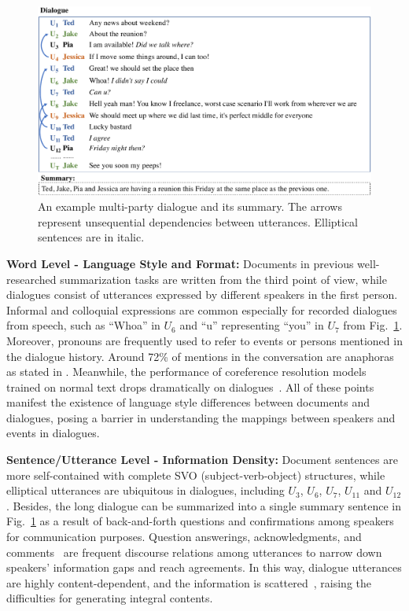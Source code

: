 \begin{figure}[ht]
	\centering
	\includegraphics[scale=0.48]{fig/example.pdf}
	\caption{An example multi-party dialogue and its summary. The arrows represent unsequential dependencies between utterances. Elliptical sentences are in italic.}
	\label{fig:example}
\end{figure}

\textbf{Word Level - Language Style and Format:} 
Documents in previous well-researched summarization tasks are written from the third point of view, while dialogues consist of utterances expressed by different speakers in the first person. Informal and colloquial expressions are common especially for recorded dialogues from speech, such as ``Whoa'' in $U_6$ and ``u'' representing ``you'' in $U_7$ from Fig.~\ref{fig:example}.
Moreover, pronouns are frequently used to refer to events or persons mentioned in the dialogue history. Around 72\% of mentions in the conversation are {anaphoras} %
as stated in \citet{bai2021joint}. Meanwhile, the performance of coreference resolution models trained on normal text drops dramatically on dialogues~\cite{liu2021coreference}. All of these points manifest the existence of language style differences between documents and dialogues, posing a barrier in understanding the mappings between speakers and events in dialogues.


\textbf{Sentence/Utterance Level - Information Density:}
Document sentences are more self-contained with complete SVO (subject-verb-object) structures, while elliptical utterances are ubiquitous in dialogues, including $U_3$, $U_6$, $U_7$, $U_{11}$ and $U_{12}$.
Besides, the long dialogue can be summarized into a single summary sentence in Fig.~\ref{fig:example} as a result of back-and-forth questions and confirmations among speakers for communication purposes.
Question answerings, acknowledgments, and comments~\cite{asher2016discourse} are frequent discourse relations among utterances to narrow down speakers' information gaps and reach agreements.
In this way, dialogue utterances are highly content-dependent, and the information is scattered~\cite{zhang2021exploratory}, raising the difficulties for generating integral contents.

